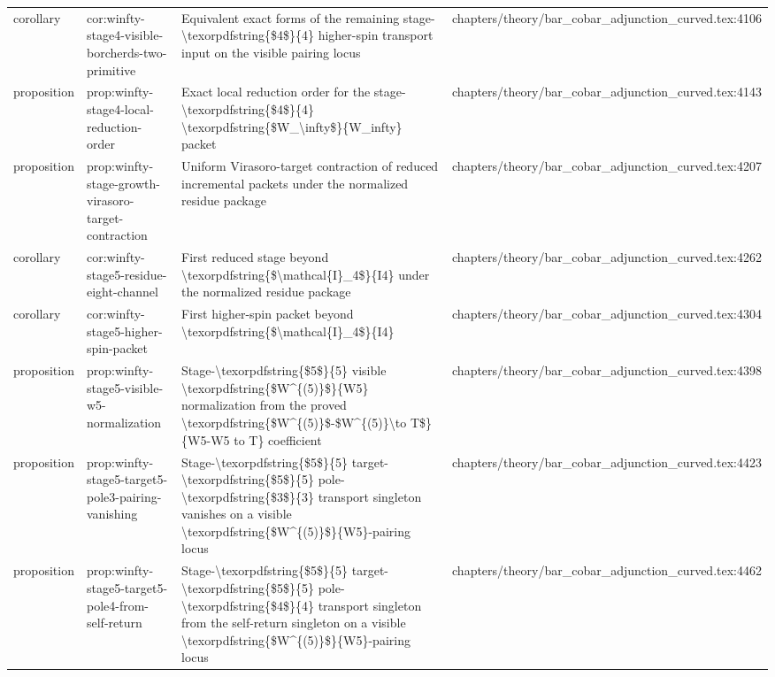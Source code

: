 \documentclass[11pt]{article}
\begin{document}
\begin{longtable}{L{0.10\textwidth}L{0.26\textwidth}L{0.42\textwidth}L{0.22\textwidth}}
corollary & cor:winfty-stage4-visible-borcherds-two-primitive & Equivalent exact forms of the remaining stage-\textbackslash{}texorpdfstring\{\$4\$\}\{4\} higher-spin transport input on the visible pairing locus & chapters/theory/bar\_cobar\_adjunction\_curved.tex:4106\\
proposition & prop:winfty-stage4-local-reduction-order & Exact local reduction order for the stage-\textbackslash{}texorpdfstring\{\$4\$\}\{4\} \textbackslash{}texorpdfstring\{\$W\_\textbackslash{}infty\$\}\{W\_infty\} packet & chapters/theory/bar\_cobar\_adjunction\_curved.tex:4143\\
proposition & prop:winfty-stage-growth-virasoro-target-contraction & Uniform Virasoro-target contraction of reduced incremental packets under the normalized residue package & chapters/theory/bar\_cobar\_adjunction\_curved.tex:4207\\
corollary & cor:winfty-stage5-residue-eight-channel & First reduced stage beyond \textbackslash{}texorpdfstring\{\$\textbackslash{}mathcal\{I\}\_4\$\}\{I4\} under the normalized residue package & chapters/theory/bar\_cobar\_adjunction\_curved.tex:4262\\
corollary & cor:winfty-stage5-higher-spin-packet & First higher-spin packet beyond \textbackslash{}texorpdfstring\{\$\textbackslash{}mathcal\{I\}\_4\$\}\{I4\} & chapters/theory/bar\_cobar\_adjunction\_curved.tex:4304\\
proposition & prop:winfty-stage5-visible-w5-normalization & Stage-\textbackslash{}texorpdfstring\{\$5\$\}\{5\} visible \textbackslash{}texorpdfstring\{\$W\textasciicircum{}\{(5)\}\$\}\{W5\} normalization from the proved \textbackslash{}texorpdfstring\{\$W\textasciicircum{}\{(5)\}\$-\$W\textasciicircum{}\{(5)\}\textbackslash{}to T\$\}\{W5-W5 to T\} coefficient & chapters/theory/bar\_cobar\_adjunction\_curved.tex:4398\\
proposition & prop:winfty-stage5-target5-pole3-pairing-vanishing & Stage-\textbackslash{}texorpdfstring\{\$5\$\}\{5\} target-\textbackslash{}texorpdfstring\{\$5\$\}\{5\} pole-\textbackslash{}texorpdfstring\{\$3\$\}\{3\} transport singleton vanishes on a visible \textbackslash{}texorpdfstring\{\$W\textasciicircum{}\{(5)\}\$\}\{W5\}-pairing locus & chapters/theory/bar\_cobar\_adjunction\_curved.tex:4423\\
proposition & prop:winfty-stage5-target5-pole4-from-self-return & Stage-\textbackslash{}texorpdfstring\{\$5\$\}\{5\} target-\textbackslash{}texorpdfstring\{\$5\$\}\{5\} pole-\textbackslash{}texorpdfstring\{\$4\$\}\{4\} transport singleton from the self-return singleton on a visible \textbackslash{}texorpdfstring\{\$W\textasciicircum{}\{(5)\}\$\}\{W5\}-pairing locus & chapters/theory/bar\_cobar\_adjunction\_curved.tex:4462\\

\end{longtable}
\end{document}
